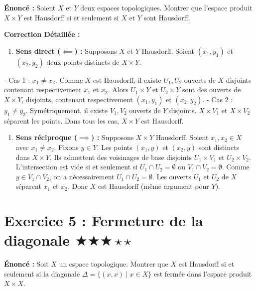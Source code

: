 \documentclass[11pt,a4paper]{article}
\begin{document}
\textbf{Énoncé :}
Soient $X$ et $Y$ deux espaces topologiques. Montrer que l'espace produit $X \times Y$ est Hausdorff si et seulement si $X$ et $Y$ sont Hausdorff.

\textbf{Correction Détaillée :}
\begin{enumerate}
\item \textbf{Sens direct ($\impliedby$) :} Supposons $X$ et $Y$ Hausdorff. Soient $(x_1, y_1)$ et $(x_2, y_2)$ deux points distincts de $X \times Y$.
\end{enumerate}
   - Cas 1 : $x_1 \neq x_2$. Comme $X$ est Hausdorff, il existe $U_1, U_2$ ouverts de $X$ disjoints contenant respectivement $x_1$ et $x_2$. Alors $U_1 \times Y$ et $U_2 \times Y$ sont des ouverts de $X \times Y$, disjoints, contenant respectivement $(x_1, y_1)$ et $(x_2, y_2)$.
   - Cas 2 : $y_1 \neq y_2$. Symétriquement, il existe $V_1, V_2$ ouverts de $Y$ disjoints. $X \times V_1$ et $X \times V_2$ séparent les points.
   Dans tous les cas, $X \times Y$ est Hausdorff.
\begin{enumerate}
\item \textbf{Sens réciproque ($\implies$) :} Supposons $X \times Y$ Hausdorff. Soient $x_1, x_2 \in X$ avec $x_1 \neq x_2$. Fixons $y \in Y$. Les points $(x_1, y)$ et $(x_2, y)$ sont distincts dans $X \times Y$. Ils admettent des voisinages de base disjoints $U_1 \times V_1$ et $U_2 \times V_2$. L'intersection est vide si et seulement si $U_1 \cap U_2 = \emptyset$ ou $V_1 \cap V_2 = \emptyset$. Comme $y \in V_1 \cap V_2$, on a nécessairement $U_1 \cap U_2 = \emptyset$. Les ouverts $U_1$ et $U_2$ de $X$ séparent $x_1$ et $x_2$. Donc $X$ est Hausdorff (même argument pour $Y$).
\end{enumerate}





\section{Exercice 5 : Fermeture de la diagonale \quad $\bigstar\bigstar\bigstar\star\star$}


\textbf{Énoncé :}
Soit $X$ un espace topologique. Montrer que $X$ est Hausdorff si et seulement si la diagonale $\Delta = \{(x, x) \mid x \in X\}$ est fermée dans l'espace produit $X \times X$.
\end{document}
